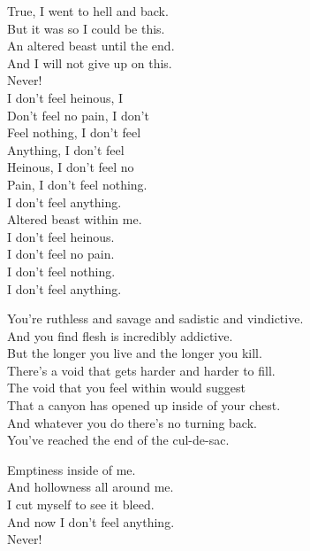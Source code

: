 True, I went to hell and back. \\
But it was so I could be this. \\
An altered beast until the end. \\
And I will not give up on this. \\
Never! \\

I don't feel heinous, I \\
Don't feel no pain, I don't \\
Feel nothing, I don't feel \\
Anything, I don't feel \\
Heinous, I don't feel no \\
Pain, I don't feel nothing. \\
I don't feel anything. \\
Altered beast within me. \\

I don't feel heinous. \\
I don't feel no pain. \\
I don't feel nothing. \\
I don't feel anything. \\


You're ruthless and savage and sadistic and vindictive. \\
And you find  flesh is incredibly addictive. \\

But the longer you live and the longer you kill. \\
There's a void that gets harder and harder to fill. \\

The void that you feel within would suggest \\
That a canyon has opened up inside of your chest. \\

And whatever you do there's no turning back. \\
You've reached the end of the cul-de-sac. \\


Emptiness inside of me. \\
And hollowness all around me. \\
I cut myself to see it bleed. \\
And now I don't feel anything. \\
Never! \\

